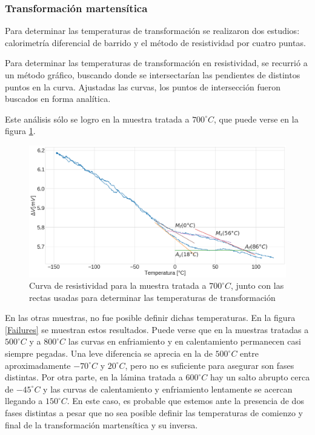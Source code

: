\documentclass[12pt]{article}
\theoremstyle{definition}
\theoremstyle{remark}
\begin{document}
{\subsubsection{Transformación martensítica}
Para determinar las temperaturas de transformación se realizaron dos estudios: calorimetría diferencial de barrido y el método de resistividad por cuatro puntas.

Para determinar las temperaturas de transformación en resistividad, se recurrió a un método gráfico, buscando donde se intersectarían las pendientes de distintos puntos en la curva. Ajustadas las curvas, los puntos de intersección fueron buscados en forma analítica.

Este análisis sólo se logro en la muestra tratada a $700 ^\circ C$, que puede verse en la figura \ref{Res700}.

\begin{figure}[H]
 	\centering
	\includegraphics[scale=0.3]{img/Resistance_700.png}
 	\caption{Curva de resistividad para la muestra tratada a $700 ^\circ C$, junto con las rectas usadas para determinar las temperaturas de transformación}
	\label{Res700}
\end{figure}

En las otras muestras, no fue posible definir dichas temperaturas. En la figura \ref{Failures} se muestran estos resultados. Puede verse que en la muestras tratadas a $500 ^\circ C$ y a $800 ^\circ C$ las curvas en enfriamiento y en calentamiento permanecen casi siempre pegadas. Una leve diferencia se aprecia en la de  $500 ^\circ C$ entre aproximadamente $-70 ^\circ C$ y $20 ^\circ C$, pero no es suficiente para asegurar son fases distintas. Por otra parte, en la lámina tratada a $600 ^\circ C$ hay un salto abrupto cerca de  $-45 ^\circ C$ y las curvas de calentamiento y enfriamiento lentamente se acercan llegando a $150 ^\circ C$. En este caso, es probable que estemos ante la presencia de dos fases distintas a pesar que no sea posible definir las temperaturas de comienzo y final de la transformación martensítica y su inversa. 

}
\end{document}
